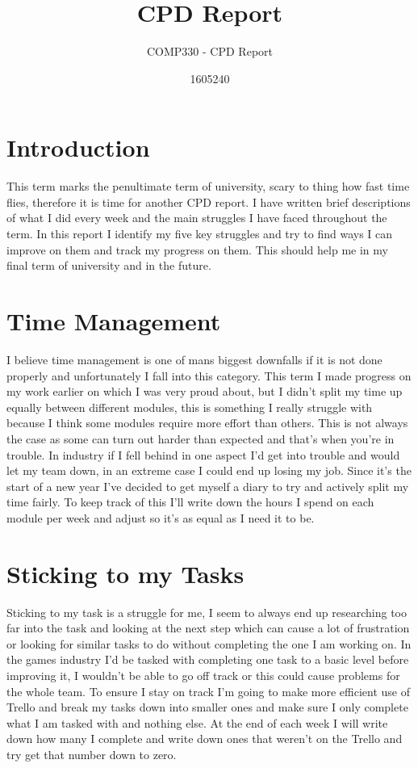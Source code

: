 \documentclass{scrartcl}
\title{CPD Report}
\subtitle{COMP330 - CPD Report}
\author{1605240}
\begin{document}
\maketitle

\section*{Introduction}
This term marks the penultimate term of university, scary to thing how fast time flies, therefore it is time for another CPD report. I have written brief descriptions of what I did every week and the main struggles I have faced throughout the term. In this report I identify my five key struggles and try to find ways I can improve on them and track my progress on them. This should help me in my final term of university and in the future.


\section{Time Management}
I believe time management is one of mans biggest downfalls if it is not done properly and unfortunately I fall into this category. This term I made progress on my work earlier on which I was very proud about, but I didn't split my time up equally between different modules, this is something I really struggle with because I think some modules require more effort than others. This is not always the case as some can turn out harder than expected and that's when you're in trouble. In industry if I fell behind in one aspect I'd get into trouble and would let my team down, in an extreme case I could end up losing my job. Since it's the start of a new year I've decided to get myself a diary to try and actively split my time fairly. To keep track of this I'll write down the hours I spend on each module per week and adjust so it's as equal as I need it to be.


\section{Sticking to my Tasks}
Sticking to my task is a struggle for me, I seem to always end up researching too far into the task and looking at the next step which can cause a lot of frustration or looking for similar tasks to do without completing the one I am working on. In the games industry I'd be tasked with completing one task to a basic level before improving it, I wouldn't be able to go off track or this could cause problems for the whole team. To ensure I stay on track I'm going to make more efficient use of Trello and break my tasks down into smaller ones and make sure I only complete what I am tasked with and nothing else. At the end of each week I will write down how many I complete and write down ones that weren't on the Trello and try get that number down to zero.
\end{document}
